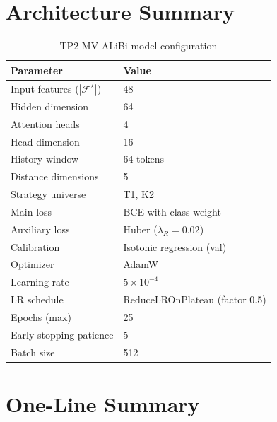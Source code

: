 \documentclass[11pt]{article}
\newcommand{\1}{\mathbf{1}}
\begin{document}
\section{Architecture Summary}

\begin{table}[h]
\centering
\caption{TP2-MV-ALiBi model configuration}
\begin{tabular}{ll}
\toprule
Parameter & Value \\
\midrule
Input features ($|\mathcal{F}^\star|$) & 48 \\
Hidden dimension & 64 \\
Attention heads & 4 \\
Head dimension & 16 \\
History window & 64 tokens \\
Distance dimensions & 5 \\
Strategy universe & T1, K2 \\
Main loss & BCE with class-weight \\
Auxiliary loss & Huber ($\lambda_R = 0.02$) \\
Calibration & Isotonic regression (val) \\
Optimizer & AdamW \\
Learning rate & $5 \times 10^{-4}$ \\
LR schedule & ReduceLROnPlateau (factor 0.5) \\
Epochs (max) & 25 \\
Early stopping patience & 5 \\
Batch size & 512 \\
\bottomrule
\end{tabular}
\end{table}

\section{One-Line Summary}

\begin{center}
\end{center}
\end{document}
